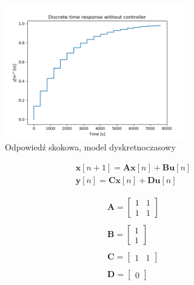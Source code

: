 \documentclass{article}
\begin{document}
\begin{figure}[H]
    \centering
    \includegraphics[width=0.7\textwidth]{img/step_resp_disc.png}
    \caption{Odpowiedź skokowa, model dyskretnoczasowy}
    \label{fig:step_resp_disc}
\end{figure}




\begin{equation}\label{eq:stan_disc}
 \begin{array}{l}
  \mathbf{x}[n+1] = \mathbf{A}\mathbf{x}[n] + \mathbf{B}\mathbf{u}[n] \\
  \mathbf{y}[n]= \mathbf{C} \mathbf{x}[n] + \mathbf{D}\mathbf{u}[n]
\end{array}
\end{equation}



\begin{equation}\label{eq:standard_ss_template}
 \begin{array}{l}
  \mathbf{A} = \begin{bmatrix}  1 & 1 \\
  							   1 & 1 
  			   \end{bmatrix} \\ \\
  \mathbf{B} = \begin{bmatrix} 1 \\ 1 \end{bmatrix} \\ \\
  \mathbf{C} = \begin{bmatrix} 1 & 1 \end{bmatrix} \\ \\
  \mathbf{D} = \begin{bmatrix} 0 \end{bmatrix} \\
\end{array}
\end{equation}
\end{document}
